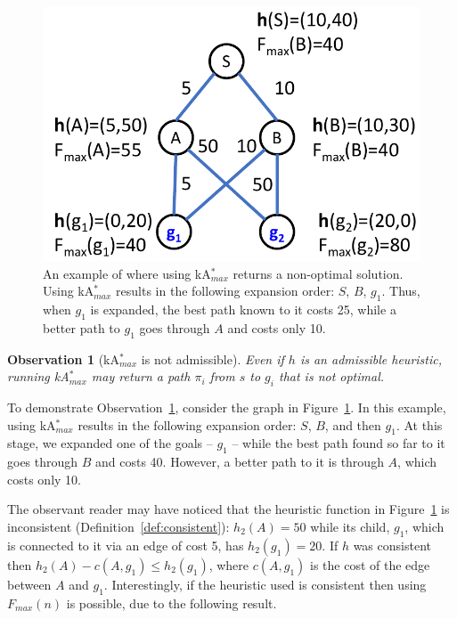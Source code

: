 \documentclass{aicom2e}
\newtheorem{observation}{Observation}
\newcommand{\kastar}{kA$^*$}
\newcommand{\kastarmax}{kA$^*_{max}$}
\newcommand{\maxf}{$F_{max}(n)$}
\begin{document}
\begin{figure}
 \includegraphics[width=\columnwidth]{max-bad_cropped.pdf}
 \caption{An example of where using \kastarmax{} returns a non-optimal solution. Using \kastarmax{} results in the following expansion order: $S$, $B$, $g_1$. 
 Thus, when $g_1$ is expanded, the best path known to it costs 25, while a
 better path to $g_1$ goes through $A$ and costs only 10.}
 \label{fig:max-bad}
 \end{figure}

 \begin{observation}[\kastarmax{} is not admissible]
    Even if $h$ is an admissible heuristic,
    running \kastarmax{} may return a path $\pi_i$ from $s$ to $g_i$ that is not optimal.
    \label{obs:max-f-inadmissible}
 \end{observation}


To demonstrate Observation~\ref{obs:max-f-inadmissible}, consider the graph in
Figure~\ref{fig:max-bad}. In this example, using \kastarmax{} results in the following
expansion order: $S$, $B$, and then $g_1$. At this stage, we expanded one of
the goals -- $g_1$ -- while the best path found so far to it goes through $B$
and costs 40. However, a better path to it is through $A$, which costs only 10.




The observant reader may have noticed that the heuristic function in
Figure~\ref{fig:max-bad} is inconsistent (Definition~\ref{def:consistent}):
$h_2(A)=50$ while its child, $g_1$, which is connected to it via an edge of
cost 5, has $h_2(g_1)=20$. If $h$ was consistent then $h_2(A)-c(A,g_1)\leq
h_2(g_1)$, where $c(A,g_1)$ is the cost of the edge between $A$ and $g_1$.
Interestingly, if the heuristic used is consistent then using \maxf{} is possible, 
due to the following result.%
\end{document}
